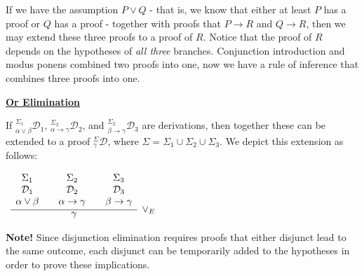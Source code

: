 \documentclass{book}
\begin{document}
    If we have the assumption $P \lor Q$ - that is, we know that either at least $P$ has a proof or $Q$ has a proof - together with proofs that $P \to R$ and $Q \to R$, then we may extend these three proofs to a proof of $R$. Notice that the proof of $R$ depends on the hypotheses of \emph{all three} branches. Conjunction introduction and modus ponens combined two proofs into one, now we have a rule of inference that combines three proofs into one. 

    \begin{mdframed}

        \underline{{\bf Or Elimination}}

        If $^{\Sigma_{1}}_{\alpha\lor\beta}\mathcal{D}_{1}$, $^{\Sigma_{2}}_{\alpha\rightarrow\gamma}\mathcal{D}_{2}$, and $^{\Sigma_{2}}_{\beta\rightarrow\gamma}\mathcal{D}_{3}$ are derivations, then together these can be extended to a proof $^{\Sigma}_{\gamma}\mathcal{D}$, where $\Sigma = \Sigma_{1} \cup \Sigma_{2} \cup \Sigma_{3}$. We depict this extension as follows: 

        \begin{center}
            $\begin{array}{ c }
	
                \infer[\lor_{E}]{\gamma}
                    {
                    \begin{array}{c} \Sigma_{1}  \\ \mathcal{D}_{1} \\ \alpha\lor\beta \end{array}
                     & 
                    \begin{array}{c} \Sigma_{2}  \\ \mathcal{D}_{2} \\ \alpha\rightarrow\gamma \end{array}				
                     & 
                    \begin{array}{c} \Sigma_{3}  \\ \mathcal{D}_{3} \\ \beta\rightarrow\gamma \end{array}				 
                    }	
            
            \end{array}$            
        \end{center}
    \end{mdframed}

    {\bf Note!} Since disjunction elimination requires proofs that either disjunct lead to the same outcome, each disjunct can be temporarily added to the hypotheses in order to prove these implications. 
\end{document}

